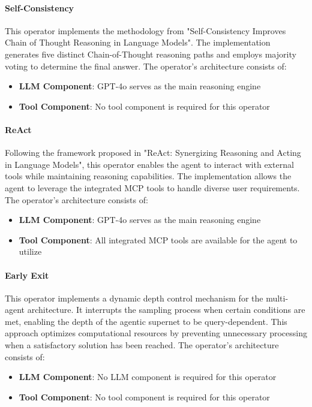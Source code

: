 \documentclass[../Main.tex]{subfiles}
\begin{document}
\paragraph{Self-Consistency} This operator implements the methodology from "Self-Consistency Improves Chain of Thought Reasoning in Language Models". The implementation generates five distinct Chain-of-Thought reasoning paths and employs majority voting to determine the final answer. The operator's architecture consists of:

\begin{itemize}
    \item \textbf{LLM Component}: GPT-4o serves as the main reasoning engine
    \item \textbf{Tool Component}: No tool component is required for this operator
\end{itemize}

\paragraph{ReAct} Following the framework proposed in "ReAct: Synergizing Reasoning and Acting in Language Models", this operator enables the agent to interact with external tools while maintaining reasoning capabilities. The implementation allows the agent to leverage the integrated MCP tools to handle diverse user requirements. The operator's architecture consists of:

\begin{itemize}
    \item \textbf{LLM Component}: GPT-4o serves as the main reasoning engine
    \item \textbf{Tool Component}: All integrated MCP tools are available for the agent to utilize
\end{itemize}

\paragraph{Early Exit} This operator implements a dynamic depth control mechanism for the multi-agent architecture. It interrupts the sampling process when certain conditions are met, enabling the depth of the agentic supernet to be query-dependent. This approach optimizes computational resources by preventing unnecessary processing when a satisfactory solution has been reached. The operator's architecture consists of:

\begin{itemize}
    \item \textbf{LLM Component}: No LLM component is required for this operator
    \item \textbf{Tool Component}: No tool component is required for this operator
\end{itemize}
\end{document}
